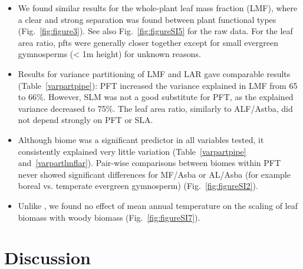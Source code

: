 \documentclass[a4paper]{article}\usepackage[]{graphicx}\usepackage[]{color}
\begin{document}
\begin{itemize}
\item We found similar results for the whole-plant leaf mass fraction (LMF), where a clear and strong separation was found between plant functional types (Fig.~\ref{fig:figure3}). See also Fig.~\ref{fig:figureSI5} for the raw data. For the leaf area ratio, pfts were generally closer together except for small evergreen gymnosperms (< 1m height) for unknown reasons. 

\item Results for variance partitioning of LMF and LAR gave comparable results (Table~\ref{varpartpipe}): PFT increased the variance explained in LMF from 65 to 66\%. However, SLM was not a good substitute for PFT, as the explained variance decreased to 75\%. The leaf area ratio, similarly to ALF/Astba, did not depend strongly on PFT or SLA.

\item Although biome was a significant predictor in all variables tested, it consistently explained very little variation (Table~\ref{varpartpipe} and~\ref{varpartlmflar}). Pair-wise comparisons between biomes within PFT never showed significant differences for MF/Asba or AL/Asba (for example boreal vs. temperate evergreen gymnosperm) (Fig.~\ref{fig:figureSI2}).

\item Unlike \cite{reich_temperature_2014}, we found no effect of mean annual temperature on the scaling of leaf biomass with woody biomass (Fig.~\ref{fig:figureSI7}).


\end{itemize}


\section{Discussion}
\end{document}
